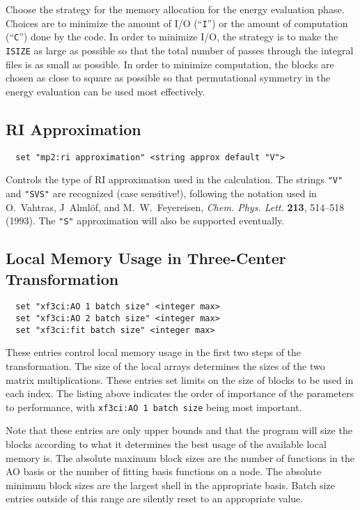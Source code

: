 Choose the strategy for the memory allocation for the energy
evaluation phase.  Choices are to minimize the amount of I/O
(``\verb+I+'') or the amount of computation (``\verb+C+'') done by the
code.  In order to minimize I/O, the strategy is to make the
\verb+ISIZE+ as large as possible so that the total number of passes
through the integral files is as small as possible.  In order to
minimize computation, the blocks are chosen as close to square as
possible so that permutational symmetry in the energy evaluation can
be used most effectively.

\subsection{RI Approximation}

\begin{verbatim}
  set "mp2:ri approximation" <string approx default "V">
\end{verbatim}

Controls the type of RI approximation used in the calculation.  The
strings \verb+"V"+ and \verb+"SVS"+ are recognized (case
sensitive!), following the notation used in O.~Vahtras, J~Alml\"of,
and M.~W.~Feyereisen, {\em Chem. Phys. Lett.} {\bf 213}, 514--518
(1993).  The \verb+"S"+ approximation will also be supported eventually.

\subsection{Local Memory Usage in Three-Center Transformation}

\begin{verbatim}
  set "xf3ci:AO 1 batch size" <integer max>
  set "xf3ci:AO 2 batch size" <integer max>
  set "xf3ci:fit batch size" <integer max>
\end{verbatim}

These entries control local memory usage in the first two steps of the
transformation.  The size of the local arrays determines the sizes of
the two matrix multiplications.  These entries set limits on the size
of blocks to be used in each index.  The listing above indicates the
order of importance of the parameters to performance, with
\verb+xf3ci:AO 1 batch size+ being most important.

Note that these entries are only upper bounds and that the program
will size the blocks according to what it determines the best usage of
the available local memory is.  The absolute maximum block sizes are
the number of functions in the AO basis or the number of fitting basis
functions on a node.  The absolute minimum block sizes are the largest
shell in the appropriate basis.  Batch size entries outside of this
range are silently reset to an appropriate value.

